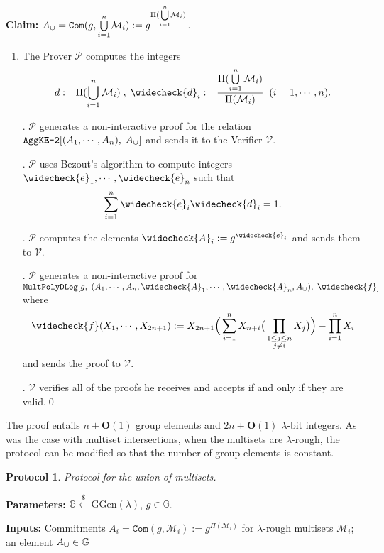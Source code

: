 \documentclass[11pt, lettersize, notitlepage, leqno, footskip=0.6cm]{article}
\newcommand{\pl}{\prod\limits}
\newcommand{\slim}{\sum\limits}
\newcommand{\ttt}{\texttt}
\newcommand{\mc}{\mathcal}
\newcommand{\mb}{\mathbb}
\newcommand{\mbf}{\mathbf}
\newcommand{\mr}{\mathrm}
\newcommand{\lam}{\lambda}
\newcommand{\lamb}{\lambda}
\newcommand{\weck}{\widecheck}
\newcommand{\bO}{\mbf{O}}
\newcommand{\mP}{\mc{P}}
\newcommand{\V}{\mc{V}}
\newcommand{\mcM}{\mc{M}}
\newcommand{\vs}{\vspace{-0.15cm}}
\newcommand{\noin}{\noindent}
\newtheorem{Prot}[Thm]{Protocol}
\numberwithin{equation}{section}
\begin{document}
\noin \textbf{Claim:} $A_{\tt{\cup}} = \protect{\verb|Com|}(g, {\bigcup\limits_{i=1}^n} \mc{M}_i) := g^{\Pi({\bigcup\limits_{i=1}^n} \mc{M}_i)}$. \vs

\begin{enumerate}[wide, labelwidth=!, labelindent=0pt]\vs \item The Prover $\mP$ computes the integers \vspace{-0.25cm} $$d:= \Pi(\bigcup\limits_{i=1}^n \mc{M}_i)\;,\;\weck{d}_i:= \frac{\Pi(\bigcup\limits_{i=1}^n \mc{M}_i)}{\Pi(\mcM_i)}\;\;(i=1,\cdots,n).$$

\noin 2. $\mP$ generates a non-interactive proof for the relation $\ttt{AggKE-2}[(A_1,\cdots,A_n),\;A_{\tt{\cup}}]$ and sends it to the Verifier $\V$. 

\noin 3. $\mP$ uses Bezout's algorithm to compute integers $\weck{e}_1,\cdots, \weck{e}_n$ such that \vs $$\slim_{i=1}^n \weck{e}_i\weck{d}_i = 1.$$\vspace{-0.3cm}

\noin 4. $\mP$ computes the elements $\weck{A}_i:= g^{\weck{e}_i}$ and sends them to $\V$.

\noin 5. $\mP$ generates a non-interactive proof for $\ttt{MultPolyDLog}[g,\;(A_1,\cdots,A_n,\weck{A}_1,\cdots,\weck{A}_n,A_{\tt{\cup}}),\; \weck{f}]$ where \vs $$\weck{f}(X_1,\cdots,X_{2n+1}):= X_{2n+1}\Big(\slim_{i=1}^n X_{n+i}\big(\pl_{\substack{1\leq j\leq n\\ j\neq i}} X_{j}\big)\Big) - \pl_{i=1}^n X_i$$ and sends the proof to $\V$.

\noin 6. $\V$ verifies all of the proofs he receives and accepts if and only if they are valid.\qed \end{enumerate}


\noin The proof entails $n+\bO(1)$ group elements and $2n+\bO(1)$ $\lam$-bit integers. As was the case with multiset intersections, when the multisets are $\lam$-rough, the protocol can be modified so that the number of group elements is constant.

\vspace{0.1cm}

\begin{Prot} Protocol for the union of multisets.\end{Prot} \vspace{-0.3cm}

\noin \textbf{Parameters:} $\mb{G}\xleftarrow{\$} \mr{GGen}(\lamb)$,\; $g\in \mb{G}$.

\noin \textbf{Inputs:} Commitments $A_i = \ttt{Com}(g, \mc{M}_i) := g^{\Pi(\mc{M}_i)}$ for $\lam$-rough multisets $\mc{M}_i$; an element $A_{\tt{\cup}}\in\mb{G}$
\end{document}
